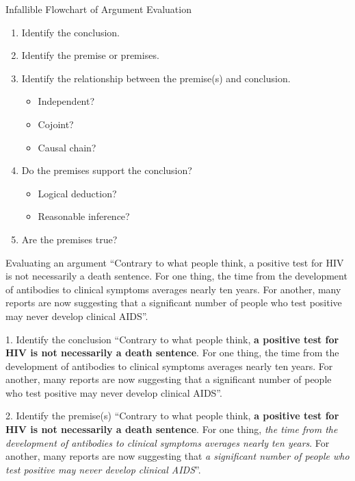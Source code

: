 \documentclass{beamer}
\begin{document}
\begin{frame}{Infallible Flowchart of Argument Evaluation}
\begin{enumerate}
\item Identify the conclusion.
\item Identify the premise or premises.
\item Identify the relationship between the premise(s) and conclusion.
\begin{itemize}
\item Independent?
\item Cojoint?
\item Causal chain?
\end{itemize}
\item Do the premises support the conclusion?
\begin{itemize}
\item Logical deduction?
\item Reasonable inference?
\end{itemize}
\item Are the premises true?
\end{enumerate}
\end{frame}


\begin{frame}{Evaluating an argument}
``Contrary to what people think, a positive test for HIV is not necessarily a death sentence. For one thing, the time from the development of antibodies to clinical symptoms averages nearly ten years. For another, many reports are now suggesting that a significant number of people who test positive may never develop clinical AIDS''.
\end{frame}


\begin{frame}{1. Identify the conclusion}
``Contrary to what people think, \textbf{a positive test for HIV is not necessarily a death sentence}. For one thing, the time from the development of antibodies to clinical symptoms averages nearly ten years. For another, many reports are now suggesting that a significant number of people who test positive may never develop clinical AIDS''.
\end{frame}


\begin{frame}{2. Identify the premise(s)}
``Contrary to what people think, \textbf{a positive test for HIV is not necessarily a death sentence}. For one thing, \emph{the time from the development of antibodies to clinical symptoms averages nearly ten years}. For another, many reports are now suggesting that \emph{a significant number of people who test positive may never develop clinical AIDS}''.
\end{frame}
\end{document}

